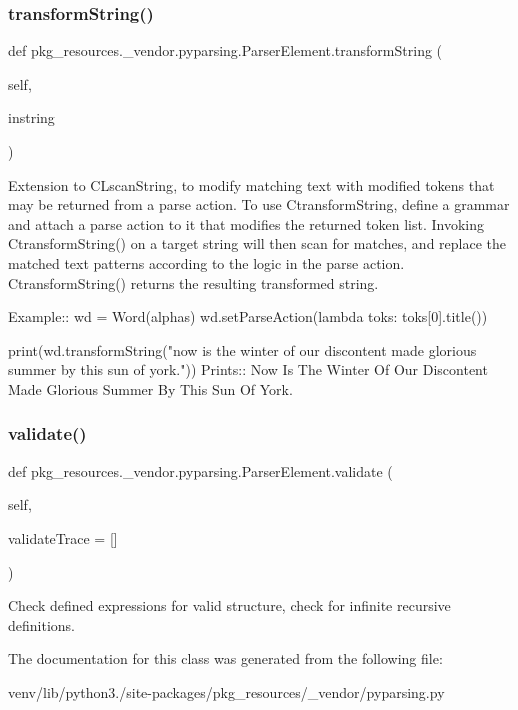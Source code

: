 \subsubsection{\texorpdfstring{transform\+String()}{transformString()}}
{\footnotesize\ttfamily def pkg\+\_\+resources.\+\_\+vendor.\+pyparsing.\+Parser\+Element.\+transform\+String (\begin{DoxyParamCaption}\item[{}]{self,  }\item[{}]{instring }\end{DoxyParamCaption})}

\begin{DoxyVerb}Extension to C{L{scanString}}, to modify matching text with modified tokens that may
be returned from a parse action.  To use C{transformString}, define a grammar and
attach a parse action to it that modifies the returned token list.
Invoking C{transformString()} on a target string will then scan for matches,
and replace the matched text patterns according to the logic in the parse
action.  C{transformString()} returns the resulting transformed string.

Example::
    wd = Word(alphas)
    wd.setParseAction(lambda toks: toks[0].title())
    
    print(wd.transformString("now is the winter of our discontent made glorious summer by this sun of york."))
Prints::
    Now Is The Winter Of Our Discontent Made Glorious Summer By This Sun Of York.
\end{DoxyVerb}
 \mbox{\label{classpkg__resources_1_1__vendor_1_1pyparsing_1_1_parser_element_acef95ab1d929446bddf8dc7c5e143c43}} 
\subsubsection{\texorpdfstring{validate()}{validate()}}
{\footnotesize\ttfamily def pkg\+\_\+resources.\+\_\+vendor.\+pyparsing.\+Parser\+Element.\+validate (\begin{DoxyParamCaption}\item[{}]{self,  }\item[{}]{validate\+Trace = {\ttfamily \mbox{[}\mbox{]}} }\end{DoxyParamCaption})}

\begin{DoxyVerb}Check defined expressions for valid structure, check for infinite recursive definitions.
\end{DoxyVerb}
 

The documentation for this class was generated from the following file\+:\begin{DoxyCompactItemize}
\item 
venv/lib/python3./site-\/packages/pkg\+\_\+resources/\+\_\+vendor/pyparsing.\+py\end{DoxyCompactItemize}
